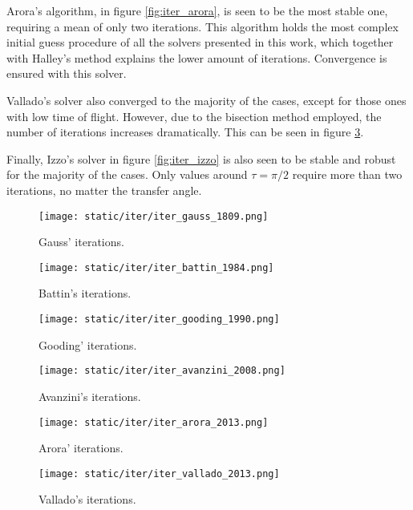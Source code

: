 Arora's algorithm, in figure \ref{fig:iter_arora}, is seen to be the most stable
one, requiring a mean of only two iterations. This algorithm holds the most
complex initial guess procedure of all the solvers presented in this work, which
together with Halley's method explains the lower amount of iterations.
Convergence is ensured with this solver.

Vallado's solver also converged to the majority of the cases, except for those
ones with low time of flight. However, due to the bisection method employed, the
number of iterations increases dramatically. This can be seen in figure
\ref{fig:iter_vallado}.

Finally, Izzo's solver in figure \ref{fig:iter_izzo} is also seen to be stable
and robust for the majority of the cases. Only values around $\tau=\pi/2$
require more than two iterations, no matter the transfer angle.


\begin{figure}[H]
  \begin{minipage}{0.48\textwidth}
    \centering
    \texttt{[image: static/iter/iter\_gauss\_1809.png]}
    \caption{Gauss' iterations.}\label{fig:iter_gauss}
  \end{minipage}\hfill
  \begin{minipage}{0.48\textwidth}
    \centering
    \texttt{[image: static/iter/iter\_battin\_1984.png]}
    \caption{Battin's iterations.}\label{fig:iter_battin}
  \end{minipage}
\end{figure}

\begin{figure}[H]
  \begin{minipage}{0.48\textwidth}
    \centering
    \texttt{[image: static/iter/iter\_gooding\_1990.png]}
    \caption{Gooding' iterations.}\label{fig:iter_gooding}
  \end{minipage}\hfill
  \begin{minipage}{0.48\textwidth}
    \centering
    \texttt{[image: static/iter/iter\_avanzini\_2008.png]}
    \caption{Avanzini's iterations.}\label{fig:iter_avanzini}
  \end{minipage}
\end{figure}

\begin{figure}[H]
  \begin{minipage}{0.48\textwidth}
    \centering
    \texttt{[image: static/iter/iter\_arora\_2013.png]}
    \caption{Arora' iterations.}\label{fig:iter_arora}
  \end{minipage}\hfill
  \begin{minipage}{0.48\textwidth}
    \centering
    \texttt{[image: static/iter/iter\_vallado\_2013.png]}
    \caption{Vallado's iterations.}\label{fig:iter_vallado}
  \end{minipage}
\end{figure}


